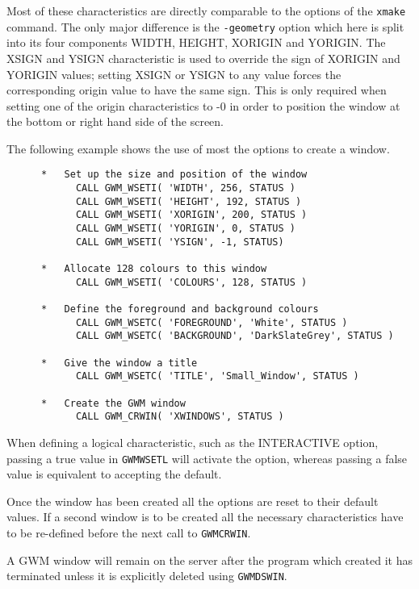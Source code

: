 \documentclass[twoside,11pt]{article}
\newcommand{\htmlref}[2]{#1}
\renewcommand{\_}{\texttt{\symbol{95}}}
\begin{document}
Most of these characteristics are directly comparable to the options
of the {\tt xmake} command. The only major difference is the 
\texttt{\htmlref{-geometry}{geometryOpt}}
option which here is split into its four components WIDTH, HEIGHT, XORIGIN
and YORIGIN. The XSIGN and YSIGN characteristic is used to override the sign of
XORIGIN and YORIGIN values; setting XSIGN or YSIGN
to any value forces the corresponding origin value to have the same
sign. This is only required when setting one of the
origin characteristics to -0 in order to position the window at the
bottom or right hand side of the screen.

The following example shows the use of most the options to create a window.

\begin{small}
\begin{verbatim}
      *   Set up the size and position of the window
            CALL GWM_WSETI( 'WIDTH', 256, STATUS )
            CALL GWM_WSETI( 'HEIGHT', 192, STATUS )
            CALL GWM_WSETI( 'XORIGIN', 200, STATUS )
            CALL GWM_WSETI( 'YORIGIN', 0, STATUS )
            CALL GWM_WSETI( 'YSIGN', -1, STATUS)

      *   Allocate 128 colours to this window
            CALL GWM_WSETI( 'COLOURS', 128, STATUS )

      *   Define the foreground and background colours
            CALL GWM_WSETC( 'FOREGROUND', 'White', STATUS )
            CALL GWM_WSETC( 'BACKGROUND', 'DarkSlateGrey', STATUS )

      *   Give the window a title
            CALL GWM_WSETC( 'TITLE', 'Small_Window', STATUS )

      *   Create the GWM window
            CALL GWM_CRWIN( 'XWINDOWS', STATUS )
\end{verbatim}
\end{small}

When defining a logical characteristic, such as the INTERACTIVE option,
passing a true value in \texttt{\htmlref{GWM\_WSETL}{GWM_WSETL}}
will activate the option,
whereas passing a false value is equivalent to accepting the default.

Once the window has been created all the options are reset to their
default values. If a second window is to be created all the necessary
characteristics have to be re-defined before the next call to
{\tt GWM\_CRWIN}.

A GWM window will remain on the server after the program which created
it has terminated unless it is explicitly deleted using 
\texttt{\htmlref{GWM\_DSWIN}{GWM_DSWIN}}.
\end{document}
